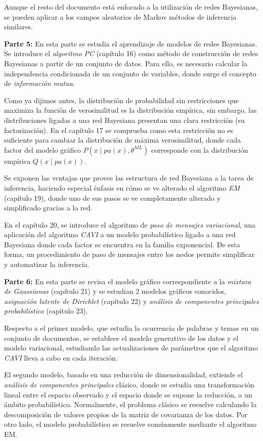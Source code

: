 Aunque el resto del documento está enfocado a la utilización de redes Bayesianas, se pueden aplicar a los campos aleatorios de Markov métodos de inferencia similares.

\textbf{Parte 5:} En esta parte se estudia el aprendizaje de modelos de redes Bayesianas. Se introduce el \emph{algoritmo PC} (capítulo 16) como método de construcción de redes Bayesianas a partir de un conjunto de datos. Para ello, es necesario calcular la independencia condicionada de un conjunto de variables, donde surge el concepto de \emph{información mutua}.

Como ya dijimos antes, la distribución de probabilidad sin restricciones que maximiza la función de verosimilitud es la distribución empírica, sin embargo, las distribuciones ligadas a una red Bayesiana presentan una clara restricción (su factorización). En el capítulo 17 se comprueba como esta restricción no es suficiente para cambiar la distribución de máxima verosimilitud, donde cada factor del modelo gráfico \(P(x \mid pa(x), \theta^{ML})\)  corresponde con la distribución empírica \(Q(x \mid pa(x))\).

Se exponen las ventajas que provee las estructura de red Bayesiana a la tarea de inferencia, haciendo especial énfasis en cómo se ve alterado el algoritmo \emph{EM} (capítulo 19), donde uno de sus pasos se ve completamente alterado y simplificado gracias a la red.

En el capítulo 20, se introduce el algoritmo de \emph{paso de mensajes variacional}, una aplicación del algoritmo \emph{CAVI} a un modelo probabilístico ligado a una red Bayesiana donde cada factor se encuentra en la familia exponencial. De esta forma, un procedimiento de paso de mensajes entre los nodos permite simplificar y automatizar la inferencia.

\textbf{Parte 6:} En esta parte se revisa el modelo gráfico correspondiente a la \emph{mixtura de Gaussianas} (capítulo 21) y se estudian 2 modelos gráficos conocidos, \emph{asignación latente de Dirichlet} (capítulo 22) y \emph{análisis de componentes principales probabilístico} (capítulo 23).

Respecto a el primer modelo, que estudia la ocurrencia de palabras y temas en un conjunto de documentos, se establece el modelo generativo de los datos y el modelo variacional, estudiando las actualizaciones de parámetros que el algoritmo \emph{CAVI} lleva a cabo en cada iteración.

El segundo modelo, basado en una reducción de dimensionalidad, extiende el \emph{análisis de componentes principales} clásico, donde se estudia una transformación lineal entre el espacio observado y el espacio donde se supone la reducción, a un ámbito probabilístico. Normalmente, el problema clásico se resuelve calculando la descomposición de valores propios de la matriz de covarianza de los datos. Por otro lado, el modelo probabilístico se resuelve comúnmente mediante el algoritmo EM.

